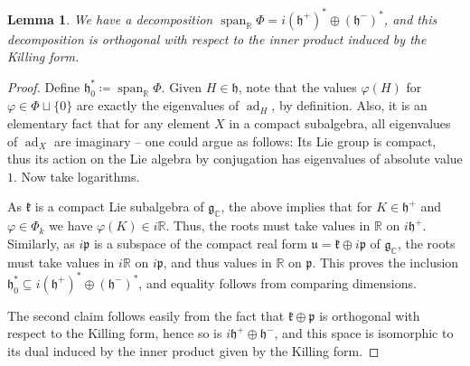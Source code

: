 \documentclass[11pt,reqno]{amsart}
\numberwithin{equation}{section}
\newtheorem{lem}[thm]{Lemma}
\theoremstyle{definition}
\theoremstyle{remark}
\newcommand{\ad}{\operatorname{ad}}
\renewcommand{\sp}{\operatorname{span}}
\newcommand{\mf}[1]{\mathfrak{#1}}
\newcommand{\C}{\mathbb{C}}
\newcommand{\R}{\mathbb{R}}
\renewcommand{\phi}{\varphi}
\renewcommand{\subset}{\subseteq}
\begin{document}
\begin{lem}\label{dualdecomp}
    We have a decomposition $\sp_\R \Phi = i(\mf{h}^+)^*\oplus (\mf{h}^-)^*$, and this decomposition is orthogonal with respect to the inner product induced by the Killing form.
\end{lem}

\begin{proof}
    Define $\mf{h}_0^* \coloneqq \sp_\R \Phi$. Given $H\in \mf{h}$, note that the values $\phi(H)$ for $\phi\in\Phi\sqcup \lbrace 0 \rbrace$ are exactly the eigenvalues of $\ad_H$, by definition. Also, it is an elementary fact that for any element $X$ in a compact subalgebra, all eigenvalues of $\ad_X$ are imaginary -- one could argue as follows: Its Lie group is compact, thus its action on the Lie algebra by conjugation has eigenvalues of absolute value $1$. Now take logarithms. 

As $\mf{k}$ is a compact Lie subalgebra of $\mf{g}_\C$, the above implies that for $K\in\mf{h}^+$ and $\phi\in\Phi_k$ we have $\phi(K)\in i\R$. Thus, the roots must take values in $\R$ on $i\mf{h}^+$. Similarly, as $i\mf{p}$ is a subspace of the compact real form $\mf{u}=\mf{k}\oplus i\mf{p}$ of $\mf{g}_\C$, the roots must take values in $i\R$ on $i\mf{p}$, and thus values in $\R$ on $\mf{p}$. This proves the inclusion $\mf{h}_0^* \subset i(\mf{h}^+)^*\oplus (\mf{h}^-)^*$, and equality follows from comparing dimensions.

The second claim follows easily from the fact that $\mf{k}\oplus \mf{p}$ is orthogonal with respect to the Killing form, hence so is $i\mf{h}^+\oplus \mf{h}^-$, and this space is isomorphic to its dual induced by the inner product given by the Killing form.

\end{proof}
\end{document}
